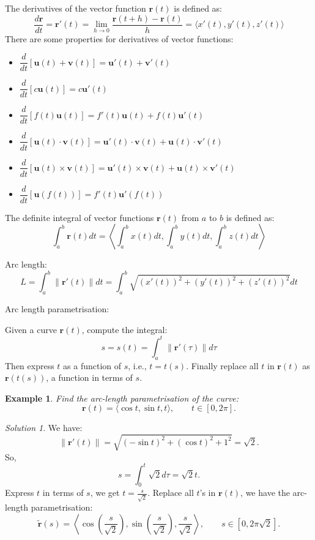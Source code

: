 \documentclass{book}
\newtheorem{example}{Example}[chapter]
\theoremstyle{remark}
\newtheorem*{solution}{Solution}
\begin{document}
The derivatives of the vector function $\mathbf{r}(t)$ is defined as:
\[
    \dfrac{d\mathbf{r}}{dt} = \mathbf{r}'(t) = \lim_{h \to 0} \frac{\mathbf{r}(t + h) - \mathbf{r}(t)}{h} = \langle x'(t), y'(t), z'(t) \rangle
\]
There are some properties for derivatives of vector functions:
\begin{itemize}
    \item $\dfrac{d}{dt} [\mathbf{u}(t) + \mathbf{v}(t)] = \mathbf{u}'(t) + \mathbf{v}'(t)$
    \item $\dfrac{d}{dt} [c\mathbf{u}(t)] = c\mathbf{u}'(t)$
    \item $\dfrac{d}{dt} [f(t) \mathbf{u}(t)] = f'(t) \mathbf{u}(t) + f(t) \mathbf{u}'(t)$
    \item $\dfrac{d}{dt} [\mathbf{u}(t) \cdot \mathbf{v}(t)] = \mathbf{u}'(t) \cdot \mathbf{v}(t) + \mathbf{u}(t) \cdot \mathbf{v}'(t)$
    \item $\dfrac{d}{dt} [\mathbf{u}(t) \times \mathbf{v}(t)] = \mathbf{u}'(t) \times \mathbf{v}(t) + \mathbf{u}(t) \times \mathbf{v}'(t)$
    \item $\dfrac{d}{dt} [\mathbf{u}(f(t))] = f'(t) \mathbf{u}'(f(t))$
\end{itemize}

The definite integral of vector functions $\mathbf{r}(t)$ from $a$ to $b$ is defined as:
\[
    \int_a^b \mathbf{r}(t) dt = \left\langle \int_a^b x(t) dt, \int_a^b y(t) dt, \int_a^b z(t) dt \right\rangle
\]

Arc length:
\[
    L = \int_a^b \| \mathbf{r}'(t) \| dt = \int_a^b \sqrt{(x'(t))^2 + (y'(t))^2 + (z'(t))^2} dt
\]

Arc length parametrisation:

Given a curve $\mathbf{r}(t)$, compute the integral:
\[
    s = s(t) = \int_a^t \| \mathbf{r}'(\tau) \| d\tau
\]
Then express $t$ as a function of $s$, i.e., $t = t(s)$. Finally replace all $t$ in $\mathbf{r}(t)$ as $\mathbf{r}(t(s))$, a function in terms of $s$.

\begin{example}
    Find the arc-length parametrisation of the curve:
    \[
        \mathbf{r}(t) = \langle \cos t, \sin t, t \rangle, \qquad t \in [0, 2\pi].
    \]
\end{example}
\begin{solution}
    We have:
    \[
        \| \mathbf{r}'(t) \| = \sqrt{(-\sin t)^2 + (\cos t)^2 + 1^2} = \sqrt{2}.
    \]
    So,
    \[
        s = \int_0^t \sqrt{2} d\tau = \sqrt{2} t.
    \]
    Express $t$ in terms of $s$, we get $t = \frac{s}{\sqrt{2}}$. Replace all $t$'s in $\mathbf{r}(t)$, we have the arc-length parametrisation:
    \[
        \tilde{\mathbf{r}}(s) = \left\langle \cos\left(\frac{s}{\sqrt{2}}\right), \sin\left(\frac{s}{\sqrt{2}}\right), \frac{s}{\sqrt{2}} \right\rangle, \qquad s \in [0, 2\pi\sqrt{2}].
    \]
\end{solution}
\end{document}
